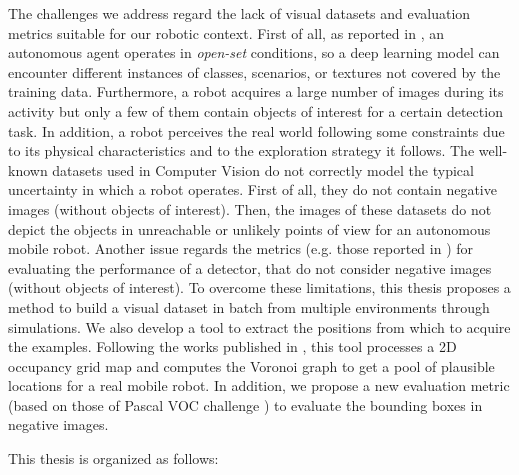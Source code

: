 The challenges we address regard the lack of visual datasets and evaluation metrics suitable for our robotic context. First of all, as reported in \cite{surveydeeplimits}, an autonomous agent operates in \textit{open-set} conditions, so a deep learning model can encounter different instances of classes, scenarios, or textures not covered by the training data. Furthermore, a robot acquires a large number of images during its activity but only a few of them contain objects of interest for a certain detection task. In addition, a robot perceives the real world following some constraints due to its physical characteristics and to the exploration strategy it follows. The well-known datasets used in Computer Vision \cite{coco, imagenet, pascal} do not correctly model the typical uncertainty in which a robot operates. First of all, they do not contain negative images (without objects of interest). Then, the images of these datasets do not depict the objects in unreachable or unlikely points of view for an autonomous mobile robot. Another issue regards the metrics (e.g. those reported in \cite{pascal, generalizediou, coco}) for evaluating the performance of a detector, that do not consider negative images (without objects of interest). To overcome these limitations, this thesis proposes a method to build a visual dataset in batch from multiple environments through simulations. We also develop a tool to extract the positions from which to acquire the examples. Following the works published in \cite{repeatabilityslamarxiv, repeatabilityslam}, this tool processes a 2D occupancy grid map and computes the Voronoi graph to get a pool of plausible locations for a real mobile robot. In addition, we propose a new evaluation metric (based on those of Pascal VOC challenge \cite{pascal}) to evaluate the bounding boxes in negative images. 

This thesis is organized as follows:

